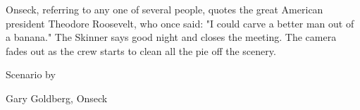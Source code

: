 \documentclass[12pt]{article}
\begin{document}
Onseck, referring to any one of several people, quotes the great American president Theodore Roosevelt, who once said: "I could carve a better man out of a banana." The Skinner says good night and closes the meeting. The camera fades out as the crew starts to clean all the pie off the scenery.

\vspace{12pt}

\centerline{Scenario by}
\centerline{Gary Goldberg, Onseck}
\end{document}

